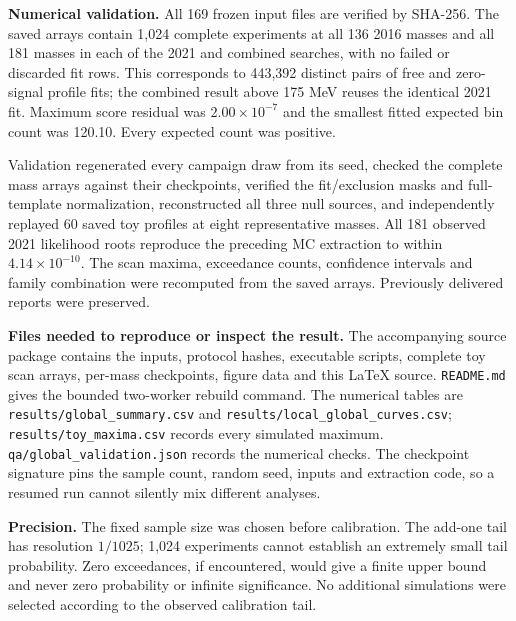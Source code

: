 \documentclass[11pt]{article}
\begin{document}
\textbf{Numerical validation.} All 169 frozen input files are verified by SHA-256. The saved arrays contain 1,024 complete experiments at all 136 2016 masses and all 181 masses in each of the 2021 and combined searches, with no failed or discarded fit rows. This corresponds to 443,392 distinct pairs of free and zero-signal profile fits; the combined result above 175 MeV reuses the identical 2021 fit. Maximum score residual was $2.00\times10^{-7}$ and the smallest fitted expected bin count was 120.10. Every expected count was positive.

Validation regenerated every campaign draw from its seed, checked the complete mass arrays against their checkpoints, verified the fit/exclusion masks and full-template normalization, reconstructed all three null sources, and independently replayed 60 saved toy profiles at eight representative masses. All 181 observed 2021 likelihood roots reproduce the preceding MC extraction to within $4.14\times10^{-10}$. The scan maxima, exceedance counts, confidence intervals and family combination were recomputed from the saved arrays. Previously delivered reports were preserved.

\textbf{Files needed to reproduce or inspect the result.} The accompanying source package contains the inputs, protocol hashes, executable scripts, complete toy scan arrays, per-mass checkpoints, figure data and this LaTeX source. \texttt{README.md} gives the bounded two-worker rebuild command. The numerical tables are \texttt{results/global\_summary.csv} and \texttt{results/local\_global\_curves.csv}; \texttt{results/toy\_maxima.csv} records every simulated maximum. \texttt{qa/global\_validation.json} records the numerical checks. The checkpoint signature pins the sample count, random seed, inputs and extraction code, so a resumed run cannot silently mix different analyses.

\textbf{Precision.} The fixed sample size was chosen before calibration. The add-one tail has resolution $1/1025$; 1,024 experiments cannot establish an extremely small tail probability. Zero exceedances, if encountered, would give a finite upper bound and never zero probability or infinite significance. No additional simulations were selected according to the observed calibration tail.
\end{document}
